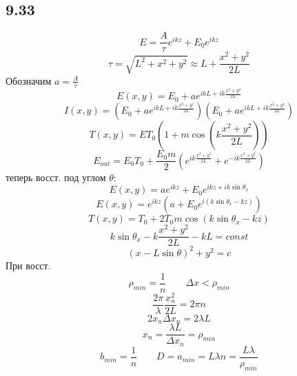 \subsection*{9.33}
$$E = \frac{A}{\tau} e^{i k z} + E_0 e^{i k z}$$
$$\tau = \sqrt{L^2 + x^2 + y^2} \approx L + \frac{x^2 + y^2}{2 L}$$
Обозначим $a = \frac{A}{\tau}$
$$E(x, y) = E_0 + a e^{i k L + i k \frac{x^2 + y^2}{2L}}$$
$$I(x, y) =(E_0 + a e^{i k L + i k \frac{x^2 + y^2}{2L}})(E_0 + a e^{i k L + i k \frac{x^2 + y^2}{2L}})$$
$$T(x,y) = E T_0 (1 + m \cos (k \frac{x^2 + y^2}{2L}))$$
$$E_{out} = E_0 T_0 + \frac{E_0 m}{2} (e^{ i k \frac{x^2 + y^2}{2L}} + e^{- i k \frac{x^2 + y^2}{2L}})$$
теперь восст. под углом $\theta$:
$$E(x,y) = a e^{i k z} + E_0 e^{ikz + ik\sin \theta_x}$$
$$E(x,y) = e^{ikz}(a + E_0 e^{i(k\sin \theta_x - kz)})$$
$$T(x,y) = T_0 + 2T_0 m \cos (k \sin \theta_x - kz)$$
$$k \sin \theta_x - k \frac{x^2 + y^2}{2L} - kL = const$$
$$(x- L\sin \theta)^2 + y^2 = c$$
При восст.
$$\rho_{min} = \frac{1}{n} \qquad \Delta x < \rho_{min}$$
$$\frac{2\pi}{\lambda} \frac{x^2_n}{2L} = 2 \pi n$$
$$2x_n \Delta x_n = 2 \lambda L$$
$$x_n = \frac{\lambda L}{\Delta x_n} = \rho_{min}$$
$$b_{min} = \frac{1}{n} \qquad D = a_{min} = L \lambda n  = \frac{L \lambda}{\rho_{min}}$$
